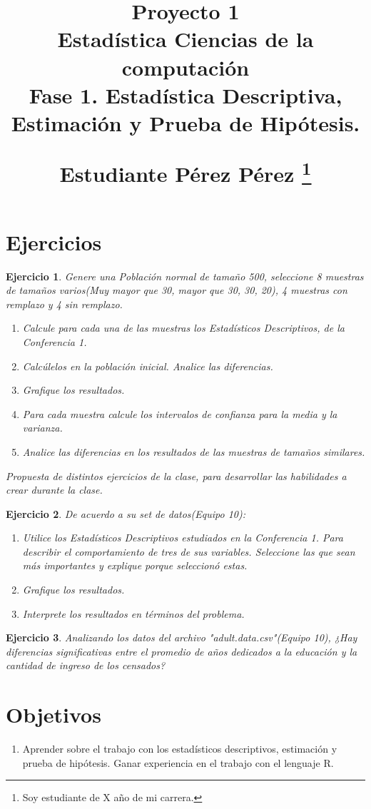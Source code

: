 \documentclass[10pt,twocolumn,a4paper]{article}
\title{\LARGE{\textbf{Proyecto 1} \\
		
		
		
		  Estad\'istica \; \; \; Ciencias de la computaci\'on\\
	
	
	
	\textbf{Fase 1. Estadística Descriptiva, Estimación y Prueba de Hipótesis.}}

Estudiante P\'erez P\'erez \footnote{Soy estudiante de X año de mi carrera.}\\}
\date{}
\newtheorem{eje}{Ejercicio}
\begin{document}
\maketitle
\setcounter{page}{1}


\section*{Ejercicios}
\begin{eje}
    Genere una Población normal de tamaño 500, seleccione 8 muestras de tamaños varios(Muy mayor que 30, mayor que 30, 30, 20), 4 muestras con remplazo y 4 sin remplazo.
    \begin{enumerate}
        \item Calcule para cada una de las muestras los Estadísticos Descriptivos, de la Conferencia 1.
        \item Calcúlelos en la población inicial. Analice las diferencias.
        \item Grafique los resultados.
        \item Para cada muestra calcule los intervalos de confianza para la media y la varianza.
        \item Analice las diferencias en los resultados de las muestras de tamaños similares.
    \end{enumerate}
	Propuesta de distintos ejercicios de la clase, para desarrollar las habilidades a crear durante la clase.
\end{eje}
\begin{eje}
	De acuerdo a su set de datos(Equipo 10):
	\begin{enumerate}
			\item Utilice los Estadísticos Descriptivos estudiados en la Conferencia 1. Para describir el comportamiento de tres de sus variables. Seleccione las que sean más importantes y explique porque seleccionó estas.
			\item Grafique los resultados.
			\item Interprete los resultados en términos del problema.
	\end{enumerate}
\end{eje}
\begin{eje}
    Analizando los datos del archivo "adult.data.csv"(Equipo 10), ¿Hay diferencias significativas entre el promedio de años dedicados a la educación y la cantidad de ingreso de los censados?
\end{eje}


\section*{Objetivos}
\begin{enumerate}
	\item Aprender sobre el trabajo con los estad\'isticos descriptivos, estimaci\'on y prueba de hip\'otesis. 
	Ganar experiencia en el trabajo con el lenguaje R. 
\end{enumerate}
\end{document}
